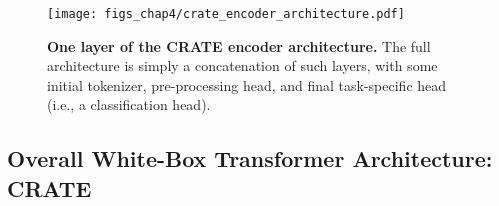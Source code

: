 \documentclass[../../book-main.tex]{subfiles}
\begin{document}

\begin{figure}
     \centering
     \texttt{[image: figs\_chap4/crate\_encoder\_architecture.pdf]}
    \caption{\small \textbf{One layer of the CRATE encoder architecture.} The full architecture is simply a concatenation of such layers, with some initial tokenizer, pre-processing head, and final task-specific head (i.e., a classification head).}
    \label{fig:arch-crate}
\end{figure}



\subsection{Overall White-Box Transformer Architecture: CRATE}
\end{document}
